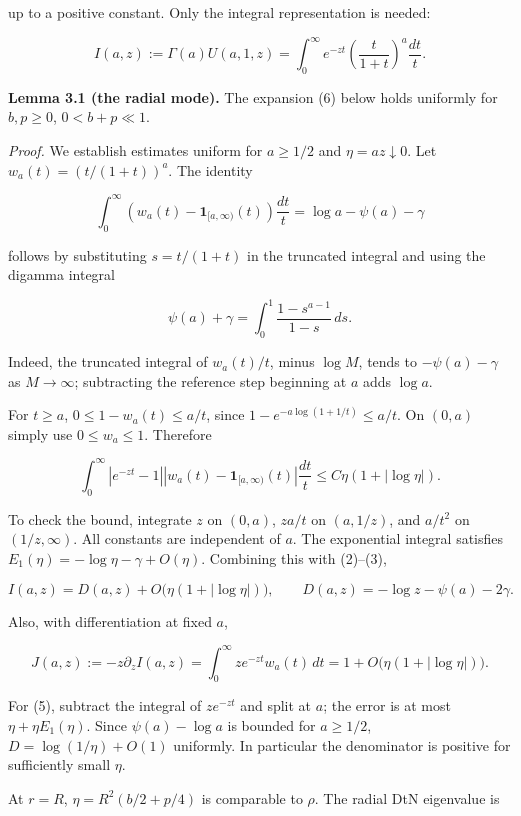 \documentclass[11pt]{article}
\begin{document}
up to a positive constant. Only the integral representation is needed:

\[I(a,z):=\Gamma(a)U(a,1,z)=\int_0^\infty e^{-zt}\left(\frac{t}{1+t}\right)^a\frac{dt}{t}.\]

\textbf{Lemma 3.1 (the radial mode).} The expansion (6) below holds
uniformly for \(b,p\geq0\), \(0<b+p\ll1\).

\emph{Proof.} We establish estimates uniform for \(a\geq1/2\) and
\(\eta=az\downarrow0\). Let \(w_a(t)=(t/(1+t))^a\). The identity

\[\int_0^\infty\left(w_a(t)-\boldsymbol1_{[a,\infty)}(t)\right)\frac{dt}{t}=\log a-\psi(a)-\gamma\tag{2}\]

follows by substituting \(s=t/(1+t)\) in the truncated integral and
using the digamma integral

\[\psi(a)+\gamma=\int_0^1\frac{1-s^{a-1}}{1-s}\,ds.\]

Indeed, the truncated integral of \(w_a(t)/t\), minus \(\log M\), tends
to \(-\psi(a)-\gamma\) as \(M\to\infty\); subtracting the reference step
beginning at \(a\) adds \(\log a\).

For \(t\geq a\), \(0\leq1-w_a(t)\leq a/t\), since
\(1-e^{-a\log(1+1/t)}\leq a/t\). On \((0,a)\) simply use
\(0\leq w_a\leq1\). Therefore

\[\int_0^\infty |e^{-zt}-1|\left|w_a(t)-\boldsymbol1_{[a,\infty)}(t)\right|\frac{dt}{t}
\leq C\eta(1+|\log\eta|).\tag{3}\]

To check the bound, integrate \(z\) on \((0,a)\), \(za/t\) on
\((a,1/z)\), and \(a/t^2\) on \((1/z,\infty)\). All constants are
independent of \(a\). The exponential integral satisfies
\(E_1(\eta)=-\log\eta-\gamma+O(\eta)\). Combining this with (2)--(3),

\[I(a,z)=D(a,z)+O\bigl(\eta(1+|\log\eta|)\bigr),\qquad
D(a,z)=-\log z-\psi(a)-2\gamma.\tag{4}\]

Also, with differentiation at fixed \(a\),

\[J(a,z):=-z\partial_z I(a,z)=\int_0^\infty z e^{-zt}w_a(t)\,dt
=1+O\bigl(\eta(1+|\log\eta|)\bigr).\tag{5}\]

For (5), subtract the integral of \(ze^{-zt}\) and split at \(a\); the
error is at most \(\eta+\eta E_1(\eta)\). Since \(\psi(a)-\log a\) is
bounded for \(a\geq1/2\), \(D=\log(1/\eta)+O(1)\) uniformly. In
particular the denominator is positive for sufficiently small \(\eta\).

At \(r=R\), \(\eta=R^2(b/2+p/4)\) is comparable to \(\rho\). The radial
DtN eigenvalue is
\end{document}
